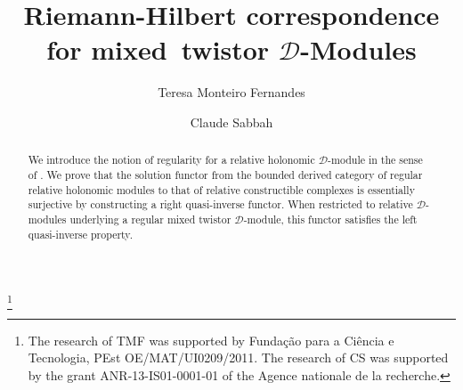 \documentclass[english]{smfart}
\numberwithin{subsection}{section}
\numberwithin{equation}{section}
\theoremstyle{plain}
\theoremstyle{definition}
\begin{document}
\frontmatter

\title{Riemann-Hilbert correspondence for mixed~twistor $\mathcal D$-Modules}

\author[T. Monteiro Fernandes]{Teresa Monteiro Fernandes}
\address[T. Monteiro Fernandes]{Centro de Matemática e Aplicações Fundamentais -- Centro de investigação Operacional e Departamento de Matemática da FCUL, Edifício C 6, Piso 2, Campo Grande, 1700, Lisboa, Portugal}

\author[C.~Sabbah]{Claude Sabbah}
\address[C.~Sabbah]{CMLS, École polytechnique, CNRS, Université Paris-Saclay\\
F--91128 Palaiseau cedex\\
France}

\thanks{The research of TMF was supported by Fundação para a Ciência e Tecnologia, PEst OE/MAT/\allowbreak UI0209/2011. The research of CS was supported by the grant ANR-13-IS01-0001-01 of the Agence nationale de la recherche.}



\begin{abstract}
We introduce the notion of regularity for a relative holonomic $\mathcal D$-module in the sense of \cite{MF-S12}. We prove that the solution functor from the bounded derived category of regular relative holonomic modules to that of relative constructible complexes is essentially surjective by constructing a right quasi-inverse functor. When restricted to relative $\mathcal D$-modules underlying a regular mixed twistor $\mathcal D$-module, this functor satisfies the left quasi-inverse property.
\end{abstract}
\maketitle

\tableofcontents
\mainmatter
\end{document}
